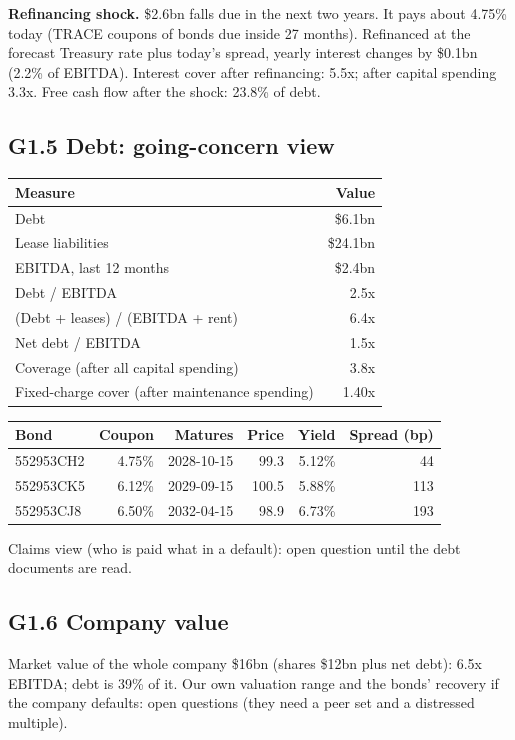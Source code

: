 \documentclass[11pt,a4paper]{article}
\begin{document}
\textbf{Refinancing shock.} \$2.6bn falls due in the next two years. It pays about 4.75\% today (TRACE coupons of bonds due inside 27 months). Refinanced at the forecast Treasury rate plus today's spread, yearly interest changes by \$0.1bn (2.2\% of EBITDA). Interest cover after refinancing: 5.5x; after capital spending 3.3x. Free cash flow after the shock: 23.8\% of debt.
\subsection*{G1.5 Debt: going-concern view}
\begin{center}\footnotesize\setlength{\tabcolsep}{3.5pt}\begin{tabular}{@{}lr@{}}\toprule
Measure & Value \\\midrule
Debt & \$6.1bn \\
Lease liabilities & \$24.1bn \\
EBITDA, last 12 months & \$2.4bn \\
Debt / EBITDA & 2.5x \\
(Debt + leases) / (EBITDA + rent) & 6.4x \\
Net debt / EBITDA & 1.5x \\
Coverage (after all capital spending) & 3.8x \\
Fixed-charge cover (after maintenance spending) & 1.40x \\
\bottomrule\end{tabular}\end{center}
\begin{center}\footnotesize\setlength{\tabcolsep}{3.5pt}\begin{tabular}{@{}lrrrrr@{}}\toprule
Bond & Coupon & Matures & Price & Yield & Spread (bp) \\\midrule
552953CH2 & 4.75\% & 2028-10-15 & 99.3 & 5.12\% & 44 \\
552953CK5 & 6.12\% & 2029-09-15 & 100.5 & 5.88\% & 113 \\
552953CJ8 & 6.50\% & 2032-04-15 & 98.9 & 6.73\% & 193 \\
\bottomrule\end{tabular}\end{center}
Claims view (who is paid what in a default): open question until the debt documents are read.
\subsection*{G1.6 Company value}
Market value of the whole company \$16bn (shares \$12bn plus net debt): 6.5x EBITDA; debt is 39\% of it. Our own valuation range and the bonds' recovery if the company defaults: open questions (they need a peer set and a distressed multiple).
\end{document}
